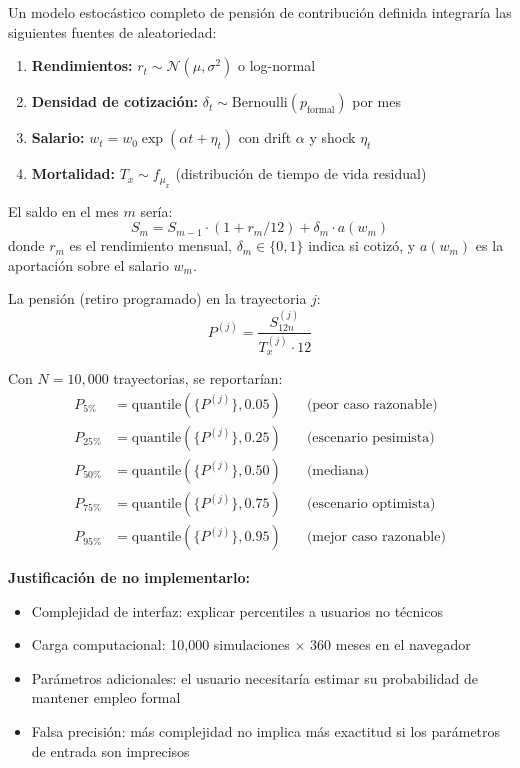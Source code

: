 \documentclass[11pt,a4paper]{report}
\begin{document}
\begin{tcolorbox}[colback=blue!5!white, colframe=blue!75!black, title=\textbf{Definici\'on Formal: Modelo Estoc\'astico Completo para Pensi\'on DC}, breakable]
Un modelo estoc\'astico completo de pensi\'on de contribuci\'on definida integrar\'ia las siguientes fuentes de aleatoriedad:

\begin{enumerate}
  \item \textbf{Rendimientos:} $r_t \sim \mathcal{N}(\mu, \sigma^2)$ o log-normal
  \item \textbf{Densidad de cotizaci\'on:} $\delta_t \sim \text{Bernoulli}(p_{\text{formal}})$ por mes
  \item \textbf{Salario:} $w_t = w_0 \exp(\alpha t + \eta_t)$ con drift $\alpha$ y shock $\eta_t$
  \item \textbf{Mortalidad:} $T_x \sim f_{\mu_x}$ (distribuci\'on de tiempo de vida residual)
\end{enumerate}

El saldo en el mes $m$ ser\'ia:
\[
  S_m = S_{m-1} \cdot (1 + r_m/12) + \delta_m \cdot a(w_m)
\]
donde $r_m$ es el rendimiento mensual, $\delta_m \in \{0, 1\}$ indica si cotiz\'o, y $a(w_m)$ es la aportaci\'on sobre el salario $w_m$.

La pensi\'on (retiro programado) en la trayectoria $j$:
\[
  P^{(j)} = \frac{S_{12n}^{(j)}}{T_x^{(j)} \cdot 12}
\]

Con $N = 10,000$ trayectorias, se reportar\'ian:
\begin{align*}
  P_{5\%}  &= \text{quantile}(\{P^{(j)}\}, 0.05) \quad &\text{(peor caso razonable)} \\
  P_{25\%} &= \text{quantile}(\{P^{(j)}\}, 0.25) \quad &\text{(escenario pesimista)} \\
  P_{50\%} &= \text{quantile}(\{P^{(j)}\}, 0.50) \quad &\text{(mediana)} \\
  P_{75\%} &= \text{quantile}(\{P^{(j)}\}, 0.75) \quad &\text{(escenario optimista)} \\
  P_{95\%} &= \text{quantile}(\{P^{(j)}\}, 0.95) \quad &\text{(mejor caso razonable)}
\end{align*}

\textbf{Justificaci\'on de no implementarlo:}
\begin{itemize}
  \item Complejidad de interfaz: explicar percentiles a usuarios no t\'ecnicos
  \item Carga computacional: 10,000 simulaciones $\times$ 360 meses en el navegador
  \item Par\'ametros adicionales: el usuario necesitar\'ia estimar su probabilidad de mantener empleo formal
  \item Falsa precisi\'on: m\'as complejidad no implica m\'as exactitud si los par\'ametros de entrada son imprecisos
\end{itemize}
\end{tcolorbox}
\end{document}
